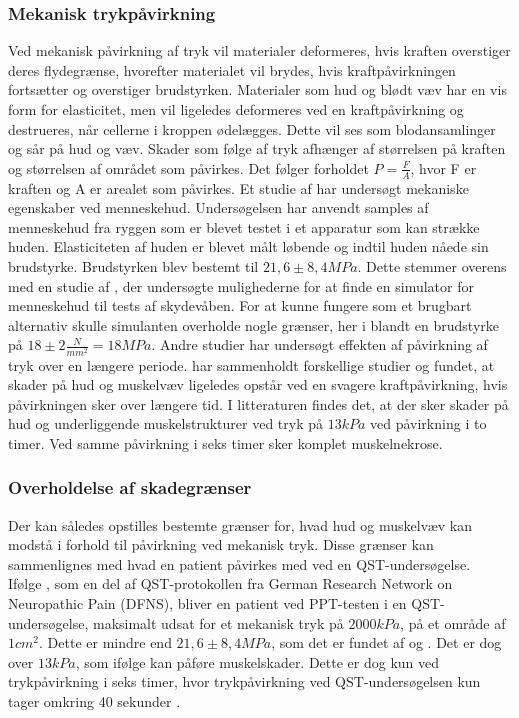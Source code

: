 \subsubsection{Mekanisk trykpåvirkning}
Ved mekanisk påvirkning af tryk vil materialer deformeres, hvis kraften overstiger deres flydegrænse, hvorefter materialet vil brydes, hvis kraftpåvirkningen fortsætter og overstiger brudstyrken. Materialer som hud og blødt væv har en vis form for elasticitet, men vil ligeledes deformeres ved en kraftpåvirkning og destrueres, når cellerne i kroppen ødelægges. Dette vil ses som blodansamlinger og sår på hud og væv. Skader som følge af tryk afhænger af størrelsen på kraften og størrelsen af området som påvirkes. Det følger forholdet $P = \frac{F}{A}$, hvor F er kraften og A er arealet som påvirkes. Et studie af  har undersøgt mekaniske egenskaber ved menneskehud. Undersøgelsen har anvendt samples af menneskehud fra ryggen som er blevet testet i et apparatur som kan strække huden. Elasticiteten af huden er blevet målt løbende og indtil huden nåede sin brudstyrke. Brudstyrken blev bestemt til $21,6 \pm 8,4 MPa$. Dette stemmer overens med en studie af , der undersøgte mulighederne for at finde en simulator for menneskehud til tests af skydevåben. For at kunne fungere som et brugbart alternativ skulle simulanten overholde nogle grænser, her i blandt en brudstyrke på $18 \pm 2 \frac{N}{mm^{2}} = 18 MPa$. Andre studier har undersøgt effekten af påvirkning af tryk over en længere periode.  har sammenholdt forskellige studier og fundet, at skader på hud og muskelvæv ligeledes opstår ved en svagere kraftpåvirkning, hvis påvirkningen sker over længere tid. I litteraturen findes det, at der sker skader på hud og underliggende muskelstrukturer ved tryk på $13 kPa$ ved påvirkning i to timer. Ved samme påvirkning i seks timer sker komplet muskelnekrose. \cite{sanders1995} \\
\subsubsection{Overholdelse af skadegrænser}
Der kan således opstilles bestemte grænser for, hvad hud og muskelvæv kan modstå i forhold til påvirkning ved mekanisk tryk. Disse grænser kan sammenlignes med hvad en patient påvirkes med ved en QST-undersøgelse. \\
Ifølge , som en del af QST-protokollen fra German Research Network on Neuropathic Pain (DFNS), bliver en patient ved PPT-testen i en QST-undersøgelse, maksimalt udsat for et mekanisk tryk på $2000 kPa$, på et område af $1 cm^{2}$. Dette er mindre end $21,6 \pm 8,4 MPa$, som det er fundet af  og . Det er dog over $13 kPa$, som ifølge  kan påføre muskelskader. Dette er dog kun ved trykpåvirkning i seks timer, hvor trykpåvirkning ved QST-undersøgelsen kun tager omkring 40 sekunder \cite{rolke2006}. 
